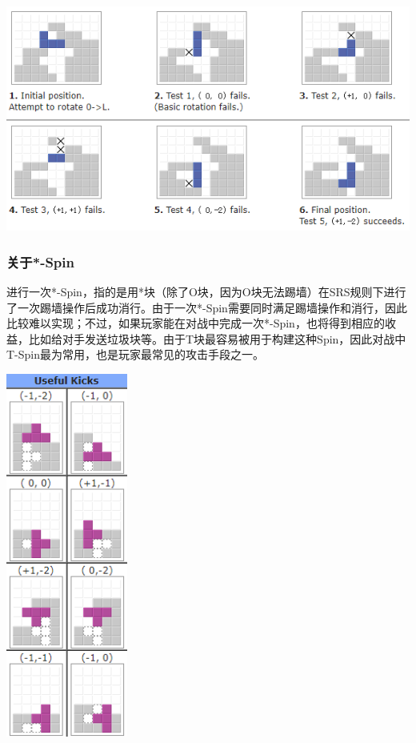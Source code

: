\documentclass[10pt,UTF8]{article}
\newenvironment{Figure}
  {\par\medskip\noindent\minipage{\linewidth}}
  {\endminipage\par\medskip}
\begin{document}
\begin{multicols}{2}
\begin{Figure}
    \centering
    \includegraphics[width=1\textwidth]{figure/kick.png}
\end{Figure}

\subsubsection{关于*-Spin}

进行一次*-Spin，指的是用*块（除了O块，因为O块无法踢墙）在SRS规则下进行了一次踢墙操作后成功消行。由于一次*-Spin需要同时满足踢墙操作和消行，因此比较难以实现；不过，如果玩家能在对战中完成一次*-Spin，也将得到相应的收益，比如给对手发送垃圾块等。由于T块最容易被用于构建这种Spin，因此对战中T-Spin最为常用，也是玩家最常见的攻击手段之一。

\begin{Figure}
    \centering
    \includegraphics[width=0.3\textwidth]{figure/spin1.png}
\end{Figure}


\end{multicols}
\end{document}
